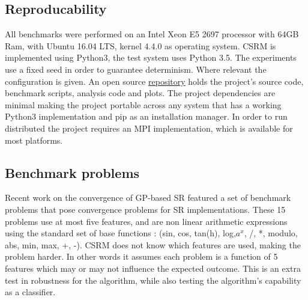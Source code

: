 \subsection{Reproducability}
All benchmarks were performed on an Intel Xeon E5 2697 processor with 64GB Ram, with Ubuntu 16.04 LTS, kernel 4.4.0 as operating system.
CSRM is implemented using Python3, the test system uses Python 3.5. 
The experiments use a fixed seed in order to guarantee determinism. Where relevant the configuration is given. 
An open source \href{https://bitbucket.org/bcardoen/csrm}{repository} holds the project's source code, benchmark scripts, analysis code and plots. The project dependencies are minimal making the project portable across any system that has a working Python3 implementation and pip as an installation manager. In order to run distributed the project requires an MPI implementation, which is available for most platforms.
\subsection{Benchmark problems}
Recent work on the convergence of GP-based SR \cite{SRAccur, SRBaseline} featured a set of benchmark problems that pose convergence problems for SR implementations. 
These 15 problems use at most five features, and are non linear arithmetic expressions using the standard set of base functions : (sin, cos, tan(h), log,$a^x$, /, *, modulo, abs, min, max, +, -).
 CSRM does not know which features are used, making the problem harder. In other words it assumes each problem is a function of 5 features which may or may not influence the expected outcome. This is an extra test in robustness for the algorithm, while also testing the algorithm's capability as a classifier. 
%                    



